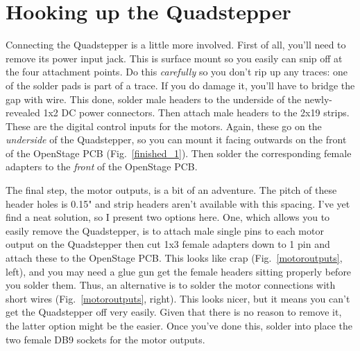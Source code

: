 \documentclass[11pt]{report} %
\begin{document}
\section{Hooking up the Quadstepper}
Connecting the Quadstepper is a little more involved. First of all, you'll need to remove its power input jack. This is surface mount so you easily can snip off at the four attachment points. Do this \textit{carefully} so you don't rip up any traces: one of the solder pads is part of a trace. If you do damage it, you'll have to bridge the gap with wire. This done, solder male headers to the underside of the newly-revealed 1x2 DC power connectors. Then attach male headers to the 2x19 strips. These are the digital control inputs for the motors. Again, these go on the \textit{underside} of the Quadstepper, so you can mount it facing outwards on the front of the OpenStage PCB (Fig.~\ref{finished_1}). Then solder the corresponding female adapters to the \textit{front} of the OpenStage PCB. 

The final step, the motor outputs, is a bit of an adventure. The pitch of these header holes is 0.15" and strip headers aren't available with this spacing. I've yet find a neat solution, so I present two options here. One, which allows you to easily remove the Quadstepper, is to attach male single pins to each motor output on the Quadstepper then cut 1x3 female adapters down to 1 pin and attach these to the OpenStage PCB. This looks like crap (Fig.~\ref{motoroutputs}, left), and you may need a glue gun get the female headers sitting properly before you solder them. Thus, an alternative is to solder the motor connections with short wires (Fig.~\ref{motoroutputs}, right). This looks nicer, but it means you can't get the Quadstepper off very easily. Given that there is no reason to remove it, the latter option might be the easier. Once you've done this, solder into place the two female DB9 sockets for the motor outputs. 
\end{document}
